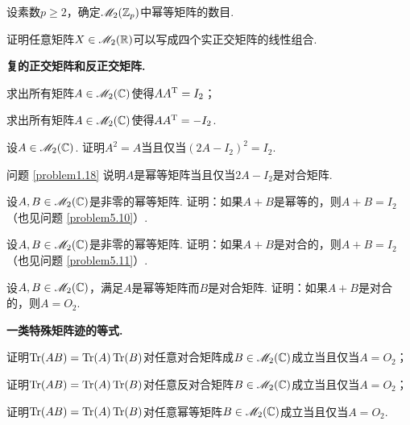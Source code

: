 \begin{mybox}
  \begin{problem}
    设素数$p\ge2$，确定$\mathscr M_2(\mathbb Z_p)$中幂等矩阵的数目.
  \end{problem}
\end{mybox}

\begin{problem}
  证明任意矩阵$X\in\mathscr M_2(\mathbb R)$可以写成四个实正交矩阵的线性组合.
\end{problem}

\begin{mybox}
  \begin{problem}
    {\bfseries 复的正交矩阵和反正交矩阵.}
    \begin{enum}
      \item 求出所有矩阵$A\in\mathscr M_2(\mathbb C)$使得$AA^{\mathrm T}=I_2$；
      \item 求出所有矩阵$A\in\mathscr M_2(\mathbb C)$使得$AA^{\mathrm T}=-I_2$.
    \end{enum}
  \end{problem}
\end{mybox}

\begin{problem}
  设$A\in\mathscr M_2(\mathbb C)$. 证明$A^2=A$当且仅当$(2A-I_2)^2=I_2$.
\end{problem}
\begin{remark}
  问题 \ref{problem1.18} 说明$A$是幂等矩阵当且仅当$2A-I_2$是对合矩阵.
\end{remark}

\begin{problem}
  设$A,B\in\mathscr M_2(\mathbb C)$是非零的幂等矩阵. 证明：如果$A+B$是幂等的，则$A+B=I_2$（也见问题 \ref{problem5.10}）.
\end{problem}

\begin{problem}
  设$A,B\in\mathscr M_2(\mathbb C)$是非零的幂等矩阵. 证明：如果$A+B$是对合的，则$A+B=I_2$（也见问题 \ref{problem5.11}）.
\end{problem}

\begin{problem}
  设$A,B\in \mathscr M_2(\mathbb C)$，满足$A$是幂等矩阵而$B$是对合矩阵. 证明：如果$A+B$是对合的，则$A=O_2$.
\end{problem}

\begin{problem}
  {\bfseries 一类特殊矩阵迹的等式.}
  \begin{enum}
    \item 证明$\operatorname{Tr}(AB)=\operatorname{Tr}(A)\operatorname{Tr}(B)$对任意对合矩阵成$B\in\mathscr M_2(\mathbb C)$成立当且仅当$A=O_2$；
    \item 证明$\operatorname{Tr}(AB)=\operatorname{Tr}(A)\operatorname{Tr}(B)$对任意反对合矩阵$B\in\mathscr M_2(\mathbb C)$成立当且仅当$A=O_2$；
    \item 证明$\operatorname{Tr}(AB)=\operatorname{Tr}(A)\operatorname{Tr}(B)$对任意幂等矩阵$B\in\mathscr M_2(\mathbb C)$成立当且仅当$A=O_2$.
  \end{enum}
\end{problem}

